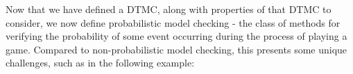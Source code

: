 


Now that we have defined a DTMC, along with properties of that DTMC to consider, we now define probabilistic model checking - the class of methods for verifying the probability of some event occurring during the process of playing a game. Compared to non-probabilistic model checking, this presents some unique challenges, such as in the following example:

